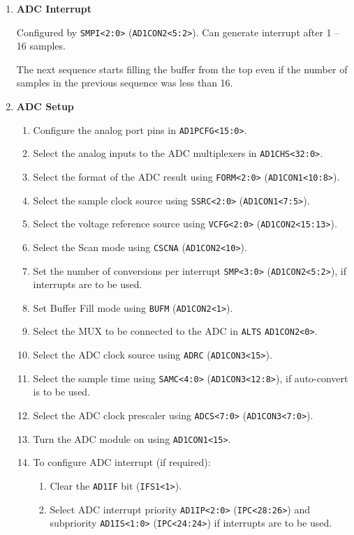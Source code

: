 \documentclass[a4paper]{article}
\begin{document}
\begin{enumerate}[label = \arabic*.]
    \item \textbf{ADC Interrupt}
      \par Configured by \verb|SMPI<2:0>| (\verb|AD1CON2<5:2>|). Can generate interrupt after 1 -- 16 samples.
      \par The next sequence starts filling the buffer from the top even if the number of samples in the previous sequence was less than 16.

    \item \textbf{ADC Setup}
      \begin{enumerate}[label = \arabic*.]
        \item Configure the analog port pins in \verb|AD1PCFG<15:0>|.
        \item Select the analog inputs to the ADC multiplexers in \verb|AD1CHS<32:0>|.
        \item Select the format of the ADC result using \verb|FORM<2:0>| (\verb|AD1CON1<10:8>|).
        \item Select the sample clock source using \verb|SSRC<2:0>| (\verb|AD1CON1<7:5>|).
        \item Select the voltage reference source using \verb|VCFG<2:0>| (\verb|AD1CON2<15:13>|).
        \item Select the Scan mode using \verb|CSCNA| (\verb|AD1CON2<10>|).
        \item Set the number of conversions per interrupt \verb|SMP<3:0>| (\verb|AD1CON2<5:2>|), if interrupts are to be used.
        \item Set Buffer Fill mode using \verb|BUFM| (\verb|AD1CON2<1>|).
        \item Select the MUX to be connected to the ADC in \verb|ALTS| \verb|AD1CON2<0>|.
        \item Select the ADC clock source using \verb|ADRC| (\verb|AD1CON3<15>|).
        \item Select the sample time using \verb|SAMC<4:0>| (\verb|AD1CON3<12:8>|), if auto-convert is to be used.
        \item Select the ADC clock prescaler using \verb|ADCS<7:0>| (\verb|AD1CON3<7:0>|).
        \item Turn the ADC module on using \verb|AD1CON1<15>|.
        \item To configure ADC interrupt (if required):
          \begin{enumerate}[label = \alph*)] %
            \item Clear the \verb|AD1IF| bit (\verb|IFS1<1>|).
            \item Select ADC interrupt priority \verb|AD1IP<2:0>| (\verb|IPC<28:26>|) and subpriority \verb|AD1IS<1:0>| (\verb|IPC<24:24>|) if interrupts are to be used.

\end{enumerate}
\end{enumerate}
\end{enumerate}
\end{document}
